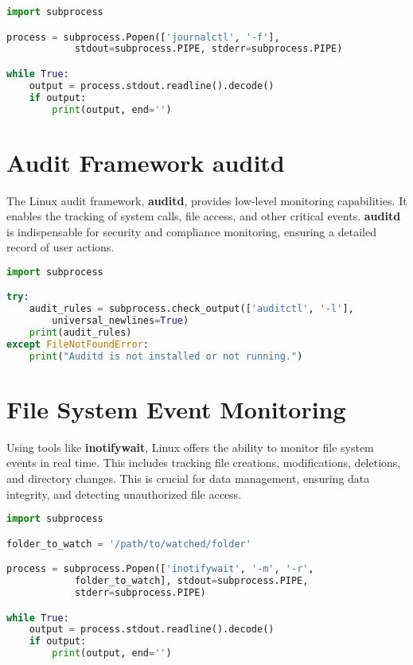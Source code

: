 \documentclass{VUMIFPSmagistrinis}
\begin{document}
\begin{lstlisting}[language=Python]
import subprocess

process = subprocess.Popen(['journalctl', '-f'], 
            stdout=subprocess.PIPE, stderr=subprocess.PIPE)

while True:
    output = process.stdout.readline().decode()
    if output:
        print(output, end='')
\end{lstlisting}

\section{Audit Framework auditd}
The Linux audit framework, \textbf{auditd}, provides low-level monitoring capabilities. It enables the tracking of system calls, file access, and other critical events. \textbf{auditd} is indispensable for security and compliance monitoring, ensuring a detailed record of user actions.
\begin{lstlisting}[language=Python]
import subprocess

try:
    audit_rules = subprocess.check_output(['auditctl', '-l'], 
        universal_newlines=True)
    print(audit_rules)
except FileNotFoundError:
    print("Auditd is not installed or not running.")
\end{lstlisting}

\section{File System Event Monitoring}
Using tools like \textbf{inotifywait}, Linux offers the ability to monitor file system events in real time. This includes tracking file creations, modifications, deletions, and directory changes. This is crucial for data management, ensuring data integrity, and detecting unauthorized file access.
\begin{lstlisting}[language=Python]
import subprocess

folder_to_watch = '/path/to/watched/folder'

process = subprocess.Popen(['inotifywait', '-m', '-r', 
            folder_to_watch], stdout=subprocess.PIPE, 
            stderr=subprocess.PIPE)

while True:
    output = process.stdout.readline().decode()
    if output:
        print(output, end='')
\end{lstlisting}
\end{document}
